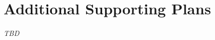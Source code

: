 \documentclass[11pt]{article}
\begin{document}
\section{Additional Supporting Plans}
\textit{TBD}




\end{document}
